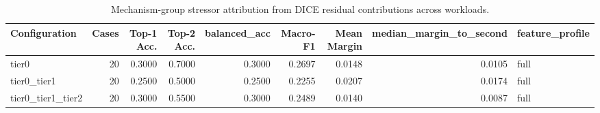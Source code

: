 \begin{table}[t]
\centering
\caption{Mechanism-group stressor attribution from DICE residual contributions across workloads.}
\label{tab:dice_stressor_diagnosis}
\footnotesize
\begin{tabular}{lrrrrrrrl}
\toprule
Configuration & Cases & Top-1 Acc. & Top-2 Acc. & balanced_acc & Macro-F1 & Mean Margin & median_margin_to_second & feature_profile \\
\midrule
tier0 & 20 & 0.3000 & 0.7000 & 0.3000 & 0.2697 & 0.0148 & 0.0105 & full \\
tier0_tier1 & 20 & 0.2500 & 0.5000 & 0.2500 & 0.2255 & 0.0207 & 0.0174 & full \\
tier0_tier1_tier2 & 20 & 0.3000 & 0.5500 & 0.3000 & 0.2489 & 0.0140 & 0.0087 & full \\
\bottomrule
\end{tabular}

\end{table}

